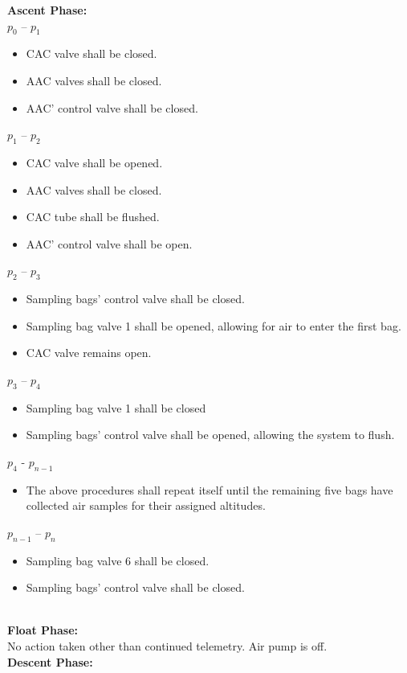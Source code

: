 \textbf{Ascent Phase:}\\
$p_0$ – $p_1$
\begin{itemize}
    \item CAC valve shall be closed.
    \item AAC valves shall be closed.
    \item AAC' control valve shall be closed.
    \end{itemize}
$p_1$ – $p_2$
\begin{itemize}
    \item CAC valve shall be opened.
    \item AAC valves shall be closed.
    \item CAC tube shall be flushed.
    \item AAC' control valve shall be open.
    \end{itemize}
$p_2$ – $p_3$
\begin{itemize}
    \item Sampling bags' control valve shall be closed.
    \item Sampling bag valve 1 shall be opened, allowing for air to enter the first bag.
    \item CAC valve remains open.
    \end{itemize}
$p_3$ – $p_4$
\begin{itemize}
    \item Sampling bag valve 1 shall be closed
    \item Sampling bags' control valve shall be opened, allowing the system to flush. 
    \end{itemize}
$p_4$ - $p_{n-1}$
\begin{itemize}
    \item The above procedures shall repeat itself until the remaining five bags have collected air samples for their assigned altitudes.
    \end{itemize}
$p_{n-1}$ – $p_n$
\begin{itemize}
    \item Sampling bag valve 6 shall be closed.
    \item Sampling bags' control valve shall be closed.
\end{itemize}


\textbf{\\Float Phase:}\\
No action taken other than continued telemetry. Air pump is off.\\
 
\textbf{Descent Phase:}

